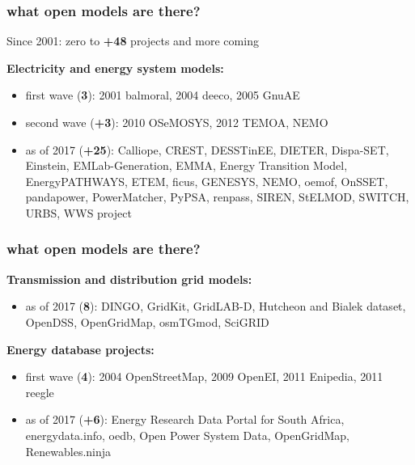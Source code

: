 \documentclass[12pt,aspectratio=169]{beamer}
\let\olditem\item
\renewcommand{\item}{%
\olditem\vspace{5pt}}
\begin{document}
\begin{frame}
  \frametitle{what open models are there?}

  Since 2001: zero to {\bf +48} projects and more coming

  {\bf Electricity and energy system models:}
  \begin{itemize}
  \item first wave ({\bf 3}): 2001 balmoral, 2004 deeco, 2005 GnuAE
  \item second wave ({\bf +3}): 2010 OSeMOSYS, 2012 TEMOA, NEMO
   \item  as of 2017 ({\bf +25}): Calliope, CREST, DESSTinEE, DIETER, Dispa-SET, Einstein,
  EMLab-Generation, EMMA, Energy Transition Model, EnergyPATHWAYS,
  ETEM, ficus, GENESYS, NEMO, oemof, OnSSET, pandapower, PowerMatcher,
  PyPSA, renpass, SIREN, StELMOD, SWITCH, URBS, WWS project
  \end{itemize}
\end{frame}

\begin{frame}
  \frametitle{what open models are there?}

  {\bf Transmission and distribution grid models:}
  \begin{itemize}
    \item as of 2017 ({\bf 8}): DINGO, GridKit, GridLAB-D, Hutcheon and Bialek dataset,
  OpenDSS, OpenGridMap, osmTGmod, SciGRID
  \end{itemize}

  {\bf Energy database projects:}
  \begin{itemize}
  \item first wave ({\bf 4}): 2004 OpenStreetMap, 2009 OpenEI, 2011 Enipedia, 2011 reegle
  \item as of 2017 ({\bf +6}): Energy Research Data Portal for South Africa, energydata.info,
  oedb, Open Power System Data, OpenGridMap, Renewables.ninja
  \end{itemize}

\end{frame}
\end{document}
